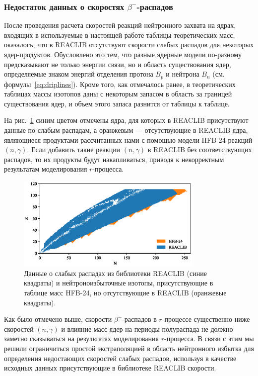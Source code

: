\subsubsection{Недостаток данных о скоростях $\beta^-$-распадов}
  После проведения расчета скоростей реакций нейтронного захвата на ядрах, входящих в используемые в настоящей работе таблицы теоретических масс, оказалось, что в REACLIB отсутствуют скорости слабых распадов для некоторых ядер-продуктов.  Обусловлено это тем, что разные ядерные модели по-разному предсказывают не только энергии связи, но и область существования ядер, определяемые знаком энергий отделения протона $B_p$ и нейтрона $B_n$ (см. формулы~\ref{eq:driplines}). Кроме того, как отмечалось ранее, в теоретических таблицах массы изотопов даны с некоторым запасом в область за границей существования ядер, и объем этого запаса разнится от таблицы к таблице. 

  На рис.~\ref{img:weak_comparison} синим цветом отмечены ядра, для которых в REACLIB присутствуют данные по слабым распадам, а оранжевым --- отсутствующие в REACLIB ядра, являющиеся продуктами рассчитанных нами с помощью модели HFB-24 реакций $(n,\gamma)$. Если добавить такие реакции $(n,\gamma)$ в REACLIB без соответствующих распадов, то их продукты будут накапливаться, приводя к некорректным результатам моделирования $r$-процесса.

\begin{figure}
  \centering
  \includegraphics[width=0.8\textwidth]{pics/chart_weak_comparison.eps}
  \caption{Данные о слабых распадах из библиотеки REACLIB (синие квадраты) и нейтроноизбыточные изотопы, присутствующие в таблице масс HFB-24, но отсутствующие в REACLIB (оранжевые квадраты).}
  \label{img:weak_comparison}
\end{figure}

  Как было отмечено выше, скорости $\beta^-$-распадов в $r$-процессе существенно ниже скоростей $(n,\gamma)$ и влияние масс ядер на периоды полураспада не должно заметно сказываться на результатах моделирования $r$-процесса. В связи с этим мы решили ограничиться простой экстраполяцией в область нейтронного избытка для определения недостающих скоростей слабых распадов, используя в качестве исходных данных присутствующие в библиотеке REACLIB скорости. 

